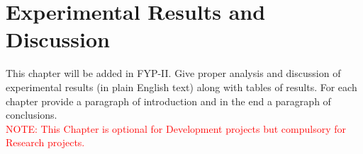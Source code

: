 \chapter{Experimental Results and Discussion}
This chapter will be added in FYP-II. Give proper analysis and discussion of experimental results (in plain English text) along with tables of results.  For each chapter provide a paragraph of introduction and in the end a paragraph of conclusions.\\
\textcolor{red}{NOTE: This Chapter is optional for Development projects but compulsory for Research projects.}

